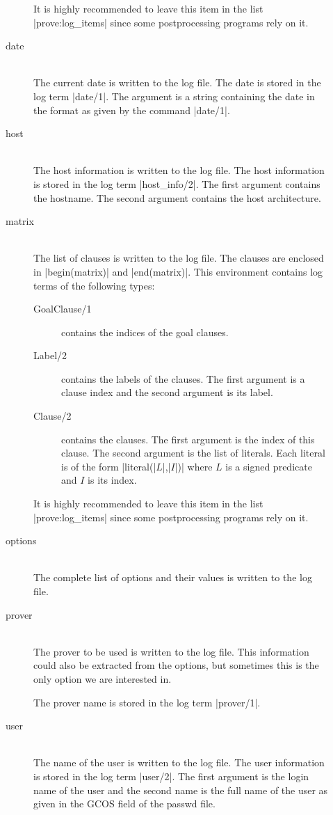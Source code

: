 \begin{description}
\begin{description}
    It is highly recommended to leave this item in the list |prove:log_items|
    since some postprocessing programs rely on it.
  \item[date]\ \\
    The current date is written to the log file. The date is stored in the log
    term |date/1|. The argument is a string containing the date in the format
    as given by the command |date/1|.
  \item[host]\ \\
    The host information is written to the log file. The host information is
    stored in the log term |host_info/2|. The first argument contains the
    hostname. The second argument contains the host architecture.
  \item[matrix]\ \\
    The list of clauses is written to the log file. The clauses are enclosed
    in |begin(matrix)| and |end(matrix)|. This environment contains log terms
    of the following types:
    \begin{description}
    \item[GoalClause/1] contains the indices of the goal clauses.
    \item[Label/2] contains the labels of the clauses. The first argument is a
      clause index and the second argument is its label.
    \item[Clause/2] contains the  clauses. The first argument is the index of
      this clause. The second argument is the list of literals. Each literal
      is of the form |literal(|$L$|,|$I$|)| where $L$\/ is a signed predicate
      and $I$\/ is its index.
    \end{description}

    It is highly recommended to leave this item in the list |prove:log_items|
    since some postprocessing programs rely on it.
  \item[options]\ \\
    The complete list of options and their values is written to the log file.
  \item[prover]\ \\
    The prover to be used is written to the log file. This information could
    also be extracted from the options, but sometimes this is the only option
    we are interested in.

    The prover name is stored in the log term |prover/1|.
  \item[user]\ \\
    The name of the user is written to the log file. The user information is
    stored in the log term |user/2|. The first argument is the login name of
    the user and the second name is the full name of the user as given in the
    GCOS field of the passwd file.
  \end{description}

\end{description}

